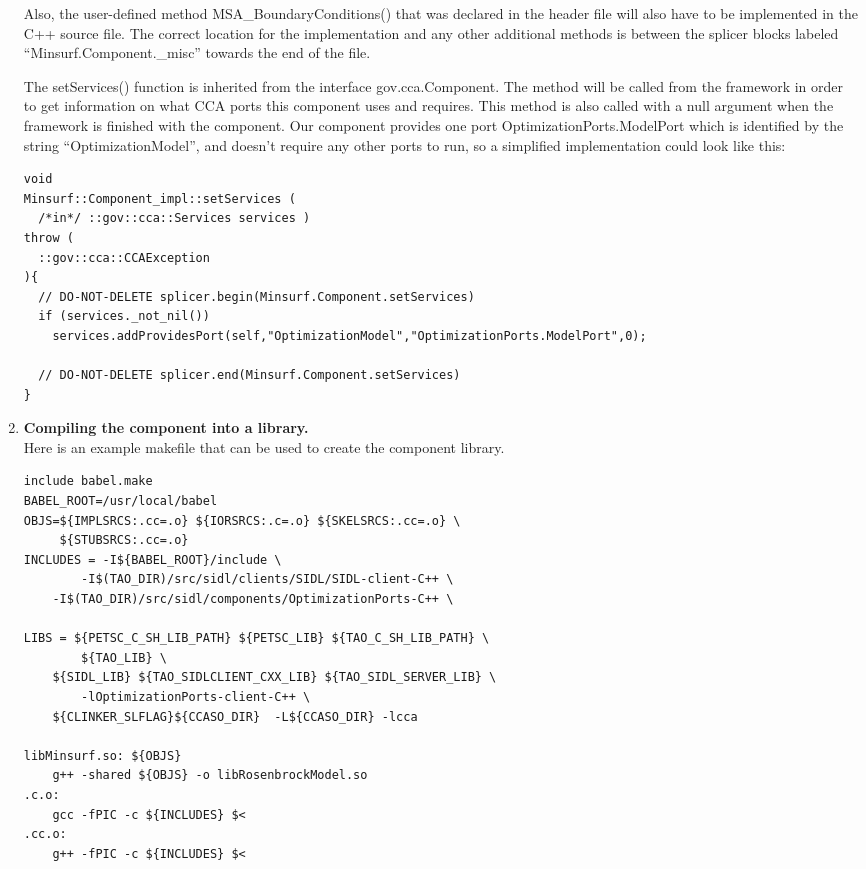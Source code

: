 \documentclass[doublespacing,12pt]{article}
\begin{document}
\begin{enumerate}
Also, the user-defined method \textsf{MSA\_BoundaryConditions()} that
was declared in the header file will also have to be implemented in
the C++ source file.  The correct location for the implementation and
any other additional methods is between the splicer blocks labeled
``Minsurf.Component.\_misc'' towards the end of the file.

The \textsf{setServices()} function is inherited from the interface
\textsf{gov.cca.Component}.  The method will be called from the framework in
order to get information on what CCA ports this component uses and
requires.  This method is also called with a null argument when the
framework is finished with the component.  Our component provides one
port \textsf{OptimizationPorts.ModelPort} which is identified by the string
``Op\-ti\-mi\-za\-tion\-Mod\-el'', and doesn't require any other ports to run, so a
simplified implementation could look like this:
\small
\begin{verbatim}
void
Minsurf::Component_impl::setServices (
  /*in*/ ::gov::cca::Services services ) 
throw ( 
  ::gov::cca::CCAException
){
  // DO-NOT-DELETE splicer.begin(Minsurf.Component.setServices)
  if (services._not_nil()) 
    services.addProvidesPort(self,"OptimizationModel","OptimizationPorts.ModelPort",0);

  // DO-NOT-DELETE splicer.end(Minsurf.Component.setServices)
}
\end{verbatim}
\normalsize

\item \textbf{Compiling the component into a library.}\\
Here is an example makefile that can be used to create the component
library.
\begin{verbatim}
include babel.make
BABEL_ROOT=/usr/local/babel
OBJS=${IMPLSRCS:.cc=.o} ${IORSRCS:.c=.o} ${SKELSRCS:.cc=.o} \
     ${STUBSRCS:.cc=.o}
INCLUDES = -I${BABEL_ROOT}/include \
        -I$(TAO_DIR)/src/sidl/clients/SIDL/SIDL-client-C++ \
	-I$(TAO_DIR)/src/sidl/components/OptimizationPorts-C++ \

LIBS = ${PETSC_C_SH_LIB_PATH} ${PETSC_LIB} ${TAO_C_SH_LIB_PATH} \
        ${TAO_LIB} \
	${SIDL_LIB} ${TAO_SIDLCLIENT_CXX_LIB} ${TAO_SIDL_SERVER_LIB} \
        -lOptimizationPorts-client-C++ \
    ${CLINKER_SLFLAG}${CCASO_DIR}  -L${CCASO_DIR} -lcca 

libMinsurf.so: ${OBJS}
	g++ -shared ${OBJS} -o libRosenbrockModel.so 
.c.o:
	gcc -fPIC -c ${INCLUDES} $<
.cc.o:
	g++ -fPIC -c ${INCLUDES} $<

\end{verbatim} %


\end{enumerate}
\end{document}
